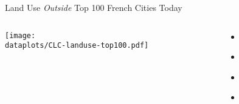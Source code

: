 \documentclass[aspectratio=169]{beamer}
\begin{document}
\begin{frame}[label=CLCmeasure]{Land Use \emph{Outside} Top 100 French Cities Today}

	\begin{columns}
	\begin{column}{0.8\textwidth}
		\begin{adjustbox}{center}
			\texttt{[image: \\dataplots/CLC-landuse-top100.pdf]}
		\end{adjustbox}
	\end{column}
	\begin{column}{0.2\textwidth}
	\begin{itemize}
	\item[] \hyperlink{LandUseMeasureParis}{}
	\item[] \hyperlink{LandUseMeasureLyon}{}
	\item[] \hyperlink{LandUseMeasureMarseille}{}
	\item[] \hyperlink{LandUseMeasureBordeaux}{}
	\end{itemize}
	\end{column}
	
	\end{columns}
\end{frame}


\end{document}
